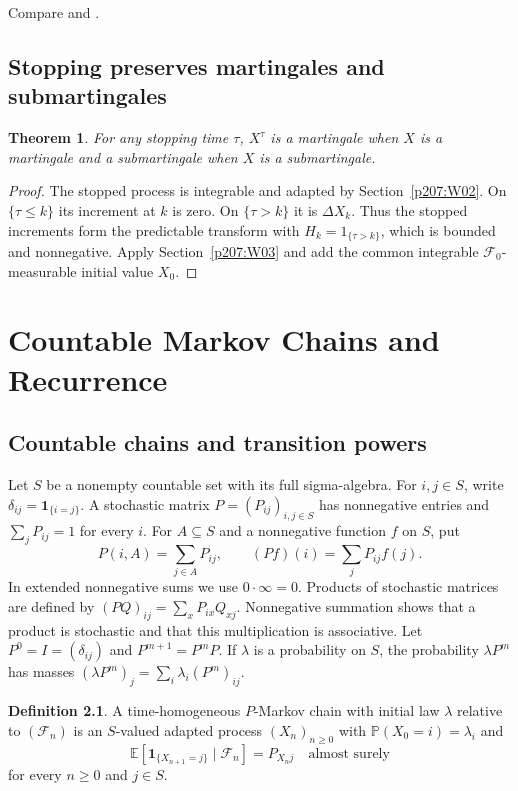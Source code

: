 \documentclass[11pt,oneside,openany]{book}
\theoremstyle{plain}
\newtheorem{theorem}{Theorem}[chapter]
\theoremstyle{definition}
\newtheorem{definition}[theorem]{Definition}
\theoremstyle{remark}
\begin{document}
Compare \cite[Sections 10.6--10.8 and 12.11]{Williams} and
\cite[Lemma 9.10]{Kallenberg}.

\section{Stopping preserves martingales and submartingales}\label{p207:W04}

\begin{theorem}
For any stopping time \(\tau\), \(X^\tau\) is a martingale
when \(X\) is a martingale and a submartingale when \(X\) is a
submartingale.
\end{theorem}
\begin{proof}
The stopped process is integrable and adapted by
Section~\ref{p207:W02}. On \(\{\tau\le k\}\) its increment at
\(k\) is zero. On \(\{\tau>k\}\) it is \(\Delta X_k\).
Thus the stopped increments form the predictable transform
with \(H_k=1_{\{\tau>k\}}\), which is bounded and nonnegative.
Apply Section~\ref{p207:W03} and add the common integrable
\(\mathcal F_0\)-measurable initial value \(X_0\).
\end{proof}
\chapter{Countable Markov Chains and Recurrence}

\section{Countable chains and transition powers}\label{p207:W05}

Let \(S\) be a nonempty countable set with its full sigma-algebra.
For \(i,j\in S\), write \(\delta_{ij}=\mathbf{1}_{\{i=j\}}\).
A stochastic matrix \(P=(P_{ij})_{i,j\in S}\) has nonnegative entries
and \(\sum_j P_{ij}=1\) for every \(i\). For \(A\subseteq S\) and a
nonnegative function \(f\) on \(S\), put
\[
 P(i,A)=\sum_{j\in A}P_{ij},
 \qquad
 (Pf)(i)=\sum_j P_{ij}f(j).
\]
In extended nonnegative sums we use \(0\cdot\infty=0\).
Products of stochastic matrices are defined by
\((PQ)_{ij}=\sum_xP_{ix}Q_{xj}\). Nonnegative summation shows that a
product is stochastic and that this multiplication is associative.
Let \(P^0=I=(\delta_{ij})\) and \(P^{m+1}=P^mP\). If \(\lambda\) is
a probability on \(S\), the probability \(\lambda P^m\) has masses
\((\lambda P^m)_j=\sum_i\lambda_i(P^m)_{ij}\).

\begin{definition}
A time-homogeneous \(P\)-Markov chain with initial law \(\lambda\)
relative to \((\mathcal F_n)\) is an \(S\)-valued adapted process
\((X_n)_{n\ge0}\) with \(\mathbb P(X_0=i)=\lambda_i\) and
\[
 \mathbb E[\mathbf{1}_{\{X_{n+1}=j\}}\mid\mathcal F_n]=P_{X_nj}
 \quad\text{almost surely}
\]
for every \(n\ge0\) and \(j\in S\).
\end{definition}
\end{document}
